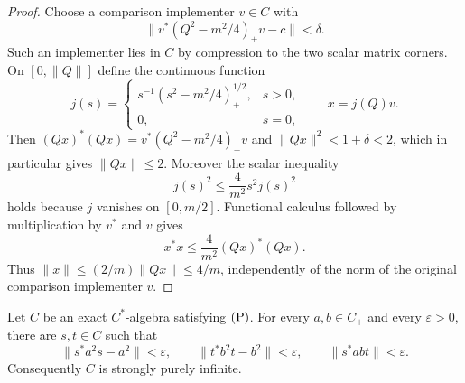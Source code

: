 \begin{proof}
Choose a comparison implementer $v\in C$ with
\[
 \|v^*(Q^2-m^2/4)_+v-c\|<\delta.
\]
Such an implementer lies in $C$ by compression to the two scalar
matrix corners.  On $[0,\|Q\|]$ define the continuous function
\[
 j(s)=\begin{cases}s^{-1}(s^2-m^2/4)_+^{1/2},&s>0,\\0,&s=0,
 \end{cases}
 \qquad x=j(Q)v.
\]
Then $(Qx)^*(Qx)=v^*(Q^2-m^2/4)_+v$ and
$\|Qx\|^2<1+\delta<2$, which in particular gives $\|Qx\|\le2$.
Moreover the scalar inequality
\[
 j(s)^2\le\frac4{m^2}s^2j(s)^2
\]
holds because $j$ vanishes on $[0,m/2]$.
Functional calculus followed by multiplication by $v^*$ and $v$ gives
\[
 x^*x\le\frac4{m^2}(Qx)^*(Qx).
\]
Thus $\|x\|\le(2/m)\|Qx\|\le4/m$, independently of the norm
of the original comparison implementer $v$.
\end{proof}

\begin{proposition}\label{prop:direct-strong-infiniteness}
Let $C$ be an exact $C^*$-algebra satisfying $\textup{(P)}$.  For every
$a,b\in C_+$ and every $\varepsilon>0$, there are $s,t\in C$ such that
\[
 \|s^*a^2s-a^2\|<\varepsilon,\qquad
 \|t^*b^2t-b^2\|<\varepsilon,\qquad
 \|s^*abt\|<\varepsilon.
\]
Consequently $C$ is strongly purely infinite.
\end{proposition}

